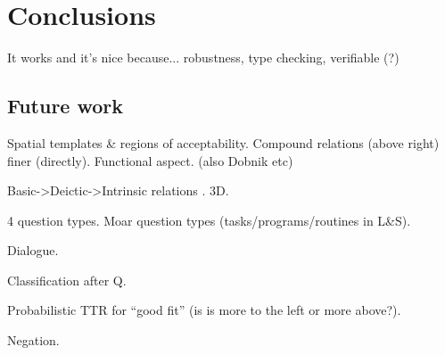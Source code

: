 \section{Conclusions}
\label{sec:conclusions}

It works and it's nice because...
robustness, type checking, verifiable (?)



\subsection{Future work}

Spatial templates \& regions of acceptability. Compound relations (above right) finer (directly). Functional aspect.  \cite{LoganComputationalAnalysisApprehension1996} (also Dobnik etc)

Basic->Deictic->Intrinsic relations  \cite{LoganComputationalAnalysisApprehension1996}. 3D.

4 question types.
Moar question types (tasks/programs/routines in L\&S).

Dialogue.

Classification after Q.

Probabilistic TTR for ``good fit'' (is is more to the left or more above?).

Negation.
